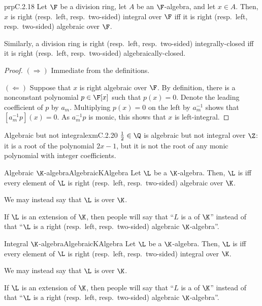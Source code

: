 \begin{prp}{}{prpC.2.18}
	Let $\F$ be a division ring, let $A$ be an $\F$-algebra, and let $x\in A$.  Then, $x$ is right (resp.~left, resp.~two-sided) integral over $\F$ iff it is right (resp.~left, resp.~two-sided) algebraic over $\F$.
	\begin{rmk}
		Similarly, a division ring is right (resp.~left, resp.~two-sided) integrally-closed iff it is right (resp.~left, resp.~two-sided) algebraically-closed.
	\end{rmk}
	\begin{proof}
		$(\Rightarrow )$ Immediate from the definitions.
		
		\blni
		$(\Leftarrow )$ Suppose that $x$ is right algebraic over $\F$.  By definition, there is a nonconstant polynomial $p\in \F [x]$ such that $p(x)=0$.  Denote the leading coefficient of $p$ by $a_m$.  Multiplying $p(x)=0$ on the left by $a_m^{-1}$ shows that $[a_m^{-1}p](x)=0$.  As $a_m^{-1}p$ is monic, this shows that $x$ is left-integral.
	\end{proof}
\end{prp}
\begin{exm}{Algebraic but not integral}{exmC.2.20}
	$\frac{1}{2}\in \Q$ is algebraic but not integral over $\Z$:  it is a root of the polynomial $2x-1$, but it is not the root of any monic polynomial with integer coefficients.
\end{exm}
\begin{dfn}{Algebraic $\K$-algebra}{AlgebraicKAlgebra}
	Let $\L$ be a $\K$-algebra.  Then, $\L$ is  iff every element of $\L$ is right (resp.~left, resp.~two-sided) algebraic over $\K$.
	\begin{rmk}
		We may instead say that $\L$ is  over $\K$.
	\end{rmk}
	\begin{rmk}
		If $\L$ is an extension of $\K$, then people will say that ``$L$ is a  of $\K$'' instead of that ``$\L$ is a right (resp.~left, resp.~two-sided) algebraic $\K$-algebra''.
	\end{rmk}
\end{dfn}
\begin{dfn}{Integral $\K$-algebra}{AlgebraicKAlgebra}
	Let $\L$ be a $\K$-algebra.  Then, $\L$ is  iff every element of $\L$ is right (resp.~left, resp.~two-sided) integral over $\K$.
	\begin{rmk}
		We may instead say that $\L$ is  over $\K$.
	\end{rmk}
	\begin{rmk}
		If $\L$ is an extension of $\K$, then people will say that ``$L$ is a  of $\K$'' instead of that ``$\L$ is a right (resp.~left, resp.~two-sided) algebraic $\K$-algebra''.
	\end{rmk}
\end{dfn}
